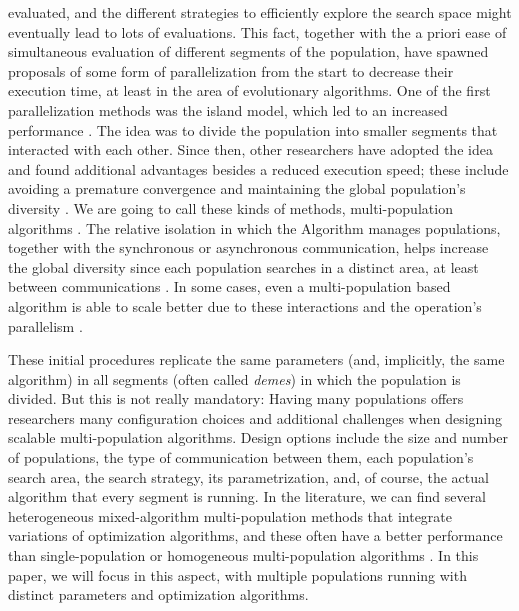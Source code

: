 \documentclass[runningheads]{llncs}
\begin{document}
evaluated, and the different strategies to efficiently explore the
search space might eventually lead to lots of evaluations.
This fact, together with the a priori ease of simultaneous evaluation
of different segments of the population, have spawned proposals of
some form of parallelization from the start
\cite{muhlenbein1988evolution} to decrease their execution time, at
least in the area of evolutionary algorithms. One of the first
parallelization methods was the island model, which led to an
increased performance
\cite{gorges1990explicit,grosso1985computer}. The idea was to divide
the population into smaller segments that interacted with each
other. Since then, other researchers have adopted the idea and found
additional advantages besides a reduced execution speed; these include
avoiding a premature convergence and maintaining the global
population's diversity \cite{li2015multi}. We are going to call these
kinds of methods, multi-population algorithms \cite{Ma2019}. The
relative isolation in which the Algorithm manages populations,
together with the synchronous or asynchronous communication, helps
increase the global diversity since each population searches in a
distinct area, at least between communications
\cite{li2016multi,wu2016differential}. In some cases, even a
multi-population based algorithm is able to scale better due to these
interactions and the operation's parallelism \cite{ALBA20027}.

These initial procedures replicate the same parameters (and,
implicitly, the same algorithm) in all
segments (often called {\em demes}) in which the population is
divided. But this is not really mandatory: Having many populations
offers researchers many configuration choices and additional
challenges when designing scalable multi-population algorithms.
Design options include the size and number of populations, the type of
communication between them, each population's search area, the search
strategy, its parametrization, and, of course, the actual algorithm
that every segment is running. In the literature, we can find several
heterogeneous mixed-algorithm multi-population methods that integrate
variations of optimization algorithms, and these often have a better performance
than single-population or homogeneous multi-population algorithms 
\cite{wu2016differential,nseef2016adaptive}. In this paper,
we will focus in this aspect, with multiple populations running with
distinct parameters and optimization algorithms.
\end{document}
